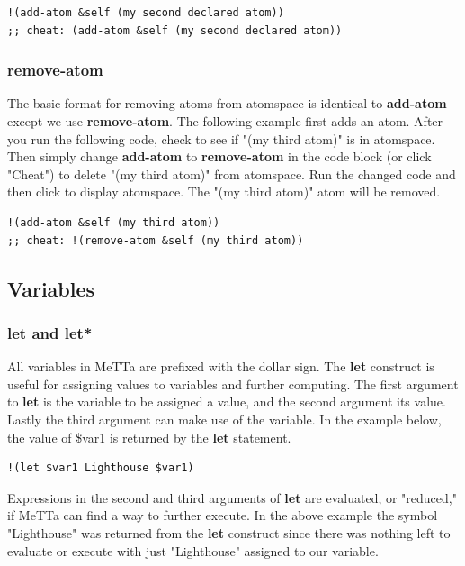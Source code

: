 \documentclass{article}
\begin{document}
\begin{verbatim}
!(add-atom &self (my second declared atom))
;; cheat: (add-atom &self (my second declared atom))
\end{verbatim}

\subsubsection{remove-atom}

The basic format for removing atoms from atomspace is identical to \textbf{add-atom} except we use \textbf{remove-atom}. The following example first adds an atom. After you run the following code, check to see if "(my third atom)" is in atomspace. Then simply change \textbf{add-atom} to \textbf{remove-atom} in the code block (or click "Cheat") to delete "(my third atom)" from atomspace.  Run the changed code and then click to display atomspace. The "(my third atom)" atom will be removed. 

\begin{verbatim}
!(add-atom &self (my third atom))
;; cheat: !(remove-atom &self (my third atom))
\end{verbatim}

\subsection{Variables}

\subsubsection{let and let*}

All variables in MeTTa are prefixed with the dollar sign. The \textbf{let} construct is useful for assigning values to variables and further computing. The first argument to \textbf{let} is the variable to be assigned a value, and the second argument its value. Lastly the third argument can make use of the variable. In the example below, the value of \$var1 is returned by the \textbf{let} statement.
 
\begin{verbatim}
!(let $var1 Lighthouse $var1)
\end{verbatim}

Expressions in the second and third arguments of \textbf{let} are evaluated, or "reduced," if MeTTa can find a way to further execute. In the above example the symbol "Lighthouse" was returned from the \textbf{let} construct since there was nothing left to evaluate or execute with just "Lighthouse" assigned to our variable. 
\end{document}
